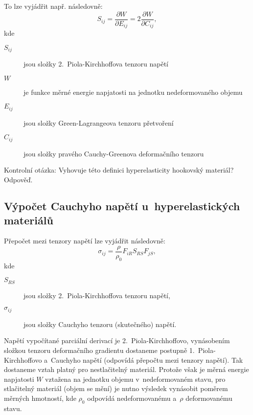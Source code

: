 To lze vyjádřit např. následovně:
\begin{equation}
	S_{ij} = \frac{\partial W}{\partial E_{ij}} = 2 \frac{\partial W}{\partial C_{ij}},
\end{equation}
kde
\begin{description}
	\item[$S_{ij}$] jsou složky 2.~Piola-Kirchhoffova tenzoru napětí
	\item[$W$] je funkce měrné energie napjatosti na jednotku nedeformovaného objemu
	\item[$E_{ij}$] jsou složky Green-Lagrangeova tenzoru přetvoření
	\item[$C_{ij}$] jsou složky pravého Cauchy-Greenova deformačního tenzoru
\end{description}

Kontrolní otázka: Vyhovuje této definici hyperelasticity hookovský materiál? Odpověď.

\subsection{Výpočet Cauchyho napětí u~hyperelastických materiálů}
Přepočet mezi tenzory napětí lze vyjádřit následovně:
\begin{equation}\label{key}
\sigma_{ij} = \frac{\rho}{\rho_0} F_{iR} S_{RS} F_{jS},
\end{equation}
kde
\begin{description}
	\item[$S_{RS}$] jsou složky 2.~Piola-Kirchhoffova tenzoru napětí,
	\item[$\sigma_{ij}$] jsou složky Cauchyho tenzoru (skutečného) napětí.
\end{description}

Napětí vypočítané parciální derivací je 2.~Piola-Kirchhoffovo, vynásobením  složkou tenzoru deformačního gradientu dostaneme postupně 1.~Piola-Kirchhoffovo a~Cauchyho napětí (odpovídá přepočtu mezi tenzory napětí).
Tak dostaneme vztah platný pro nestlačitelný materiál.
Protože však je měrná energie napjatosti $W$ vztažena na jednotku objemu v~nedeformovaném stavu, pro stlačitelný materiál (objem se mění) je nutno výsledek vynásobit poměrem měrných hmotností, kde $\rho_0$ odpovídá nedeformovanému a~$\rho$ deformovanému stavu.

